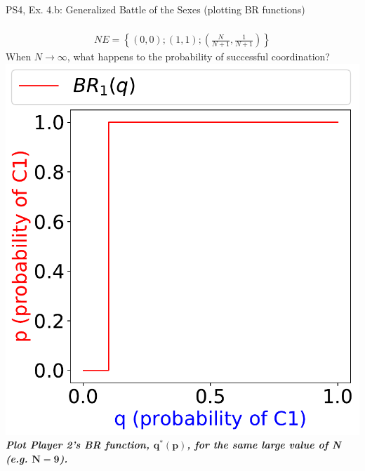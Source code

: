 \begin{frame}{PS4, Ex. 4.b: Generalized Battle of the Sexes (plotting BR functions)}
\begin{multicols}{2}
\begin{align*}
    \end{align*}
    \vspace{-6pt}
    \begin{align*}
      NE=\left\{(0,0);(1,1);\left(\frac{N}{N+1},\frac{1}{N+1}\right)\right\}
    \end{align*}
  \vfill\null \columnbreak
    When $N\rightarrow\infty$, what happens to the probability of successful coordination?\\\medskip
    \includegraphics[width=\columnwidth]{figures/4b_}
    \textbf{\textit{Plot Player 2's BR function, $\bm{q^{*}(p)}$, for the same large value of N (e.g. $\bm{N=9}$).}}
  \vfill\null
  \end{multicols}
\end{frame}
